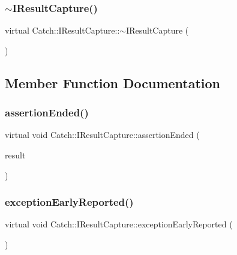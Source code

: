 \subsubsection{$\sim$\+I\+Result\+Capture()}
{\footnotesize\ttfamily virtual Catch\+::\+I\+Result\+Capture\+::$\sim$\+I\+Result\+Capture (\begin{DoxyParamCaption}{ }\end{DoxyParamCaption})\hspace{0.3cm}{\ttfamily [virtual]}}



\subsection{Member Function Documentation}
\mbox{\label{struct_catch_1_1_i_result_capture_ae45e08bccc5fb434656d4f2e44742223}} 
\subsubsection{assertion\+Ended()}
{\footnotesize\ttfamily virtual void Catch\+::\+I\+Result\+Capture\+::assertion\+Ended (\begin{DoxyParamCaption}\item[{\textbf{ Assertion\+Result} const \&}]{result }\end{DoxyParamCaption})\hspace{0.3cm}{\ttfamily [pure virtual]}}

\mbox{\label{struct_catch_1_1_i_result_capture_ae63ecec95db4c236c63ecf616f483810}} 
\subsubsection{exception\+Early\+Reported()}
{\footnotesize\ttfamily virtual void Catch\+::\+I\+Result\+Capture\+::exception\+Early\+Reported (\begin{DoxyParamCaption}{ }\end{DoxyParamCaption})\hspace{0.3cm}{\ttfamily [pure virtual]}}

